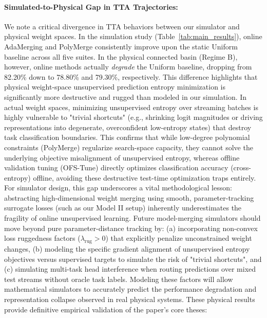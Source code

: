 \paragraph{Simulated-to-Physical Gap in TTA Trajectories:} We note a critical divergence in TTA behaviors between our simulator and physical weight spaces.
In the simulation study (Table~\ref{tab:main_results}), online AdaMerging and PolyMerge consistently improve upon the static Uniform baseline across all five suites.
In the physical connected basin (Regime B), however, online methods actually \emph{degrade} the Uniform baseline, dropping from 82.20\% down to 78.80\% and 79.30\%, respectively.
This difference highlights that physical weight-space unsupervised prediction entropy minimization is significantly more destructive and rugged than modeled in our simulation.
In actual weight spaces, minimizing unsupervised entropy over streaming batches is highly vulnerable to "trivial shortcuts" (e.g., shrinking logit magnitudes or driving representations into degenerate, overconfident low-entropy states) that destroy task classification boundaries.
This confirms that while low-degree polynomial constraints (PolyMerge) regularize search-space capacity, they cannot solve the underlying objective misalignment of unsupervised entropy, whereas offline validation tuning (OFS-Tune) directly optimizes classification accuracy (cross-entropy) offline, avoiding these destructive test-time optimization traps entirely.
For simulator design, this gap underscores a vital methodological lesson: abstracting high-dimensional weight merging using smooth, parameter-tracking surrogate losses (such as our Model II setup) inherently underestimates the fragility of online unsupervised learning.
Future model-merging simulators should move beyond pure parameter-distance tracking by: (a) incorporating non-convex loss ruggedness factors ($\lambda_{\text{rug}} > 0$) that explicitly penalize unconstrained weight changes, (b) modeling the specific gradient alignment of unsupervised entropy objectives versus supervised targets to simulate the risk of "trivial shortcuts", and (c) simulating multi-task head interference when routing predictions over mixed test streams without oracle task labels.
Modeling these factors will allow mathematical simulators to accurately predict the performance degradation and representation collapse observed in real physical systems.
These physical results provide definitive empirical validation of the paper's core theses:
